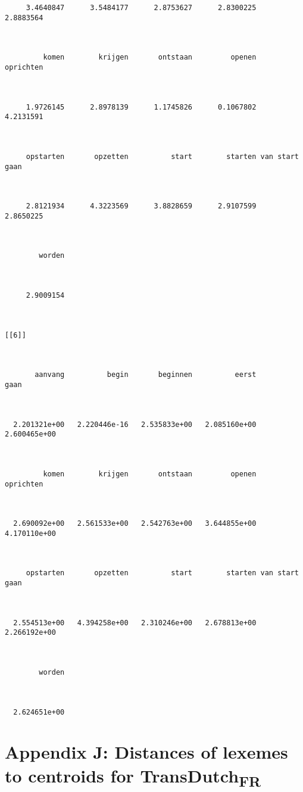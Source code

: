 \begin{lstlisting}
     3.4640847      3.5484177      2.8753627      2.8300225      2.8883564 



         komen        krijgen       ontstaan         openen      oprichten 



     1.9726145      2.8978139      1.1745826      0.1067802      4.2131591 



     opstarten       opzetten          start        starten van start gaan 



     2.8121934      4.3223569      3.8828659      2.9107599      2.8650225 



        worden 



     2.9009154 



[[6]]



       aanvang          begin       beginnen          eerst           gaan 



  2.201321e+00   2.220446e-16   2.535833e+00   2.085160e+00   2.600465e+00 



         komen        krijgen       ontstaan         openen      oprichten 



  2.690092e+00   2.561533e+00   2.542763e+00   3.644855e+00   4.170110e+00 



     opstarten       opzetten          start        starten van start gaan 



  2.554513e+00   4.394258e+00   2.310246e+00   2.678813e+00   2.266192e+00 



        worden 



  2.624651e+00 
\end{lstlisting}

\section*{Appendix J: Distances of lexemes to centroids for TransDutch\textsubscript{FR}}

